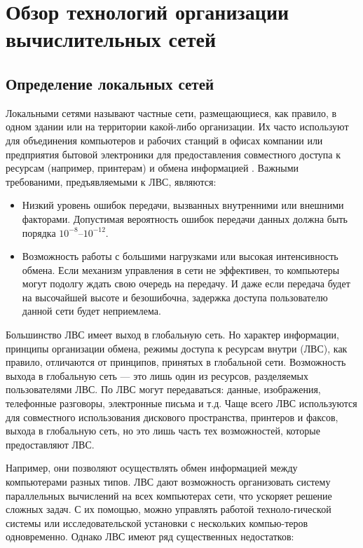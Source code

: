 \chapter{Обзор технологий организации вычислительных сетей}

\section{Определение локальных сетей}

Локальными сетями называют частные сети, размещающиеся, как правило, в одном здании или
на территории какой-либо организации. Их часто используют для объединения компьютеров и
рабочих станций в офисах компании или предприятия бытовой электроники для предоставления
совместного доступа к ресурсам (например, принтерам) и обмена информацией
\cite{tanenbaum}. Важными требованими, предъявляемыми к ЛВС, являются:

\begin{itemize}
    \item Низкий уровень ошибок передачи, вызванных внутренними или внешними факторами.
        Допустимая вероятность ошибок передачи данных должна быть порядка
        $10^{-8}$–$10^{-12}$.
    
    \item Возможность  работы  с  большими нагрузками  или высокая интенсивность обмена.
        Если механизм управления в сети не эффективен, то компьютеры могут подолгу ждать
        свою очередь на передачу. И даже если передача будет на высочайшей высоте и
        безошибочна, задержка доступа пользователю данной сети будет неприемлема.
\end{itemize}

Большинство ЛВС имеет выход в глобальную сеть. Но характер информации,  принципы
организации  обмена,  режимы  доступа  к  ресурсам внутри (ЛВС), как правило, отличаются
от принципов, принятых в глобальной сети. Возможность выхода в глобальную сеть — это
лишь один из ресурсов, разделяемых пользователями ЛВС. По ЛВС могут передаваться:
данные, изображения, телефонные разговоры, электронные письма и т.д. Чаще всего ЛВС
используются для совместного использования дискового пространства, принтеров и факсов,
выхода в глобальную сеть, но это лишь часть тех возможностей, которые предоставляют ЛВС. 

Например,  они  позволяют  осуществлять  обмен  информацией между
компьютерами  разных типов. ЛВС дают возможность организовать систему параллельных
вычислений на всех компьютерах сети, что ускоряет решение сложных задач. С их помощью,
можно управлять работой техноло-гической системы или исследовательской установки с
нескольких компью-теров одновременно. Однако ЛВС имеют ряд существенных недостатков:

